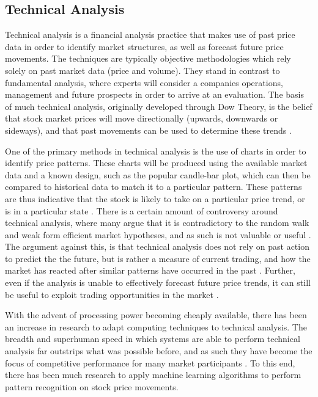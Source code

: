 \documentclass[a4paper,latin]{paper}
\begin{document}
\subsection{Technical Analysis}\label{lr_TechnicalAnalysis}

Technical analysis is a financial analysis practice that makes use of past price data in order to identify market 
structures, as well as forecast future price movements. The techniques are typically objective methodologies 
which rely solely on past market data (price and volume). They stand in contrast to fundamental analysis, where 
experts will consider a companies operations, management and future prospects in order to arrive at an evaluation. 
The basis of much technical analysis, originally developed through Dow Theory, is the belief that stock market 
prices will move directionally (upwards, downwards or sideways), and that past movements can be used to 
determine these trends  \cite {Murphy}.
\hfill \break 

One of the primary methods in technical analysis is the use of charts in order to identify price patterns. 
These charts will be produced using the available market data and a known design, such as the popular candle-bar 
plot, which can then be compared to historical data to match it to a particular pattern. These patterns are thus 
indicative that the stock is likely to take on a particular price trend, or is in a particular state \cite {Murphy}.  
There is a certain amount of controversy around technical analysis, where many argue that it is contradictory 
to the random walk and weak form efficient market hypotheses, and as such is not valuable or useful \cite {Griffioen}. 
The argument against this, is that technical analysis does not rely on past action to predict the the future, but is 
rather a measure of current trading, and how the market has reacted after similar patterns have occurred in the 
past \cite {Kahn}. Further, even if the analysis is unable to effectively forecast future price trends, it can still be useful 
to exploit trading opportunities in the market \cite{Schwager}.
\hfill \break 

With the advent of processing power becoming cheaply available, there has been an increase in research to 
adapt computing techniques to technical analysis. The breadth and superhuman speed in which systems are 
able to perform technical analysis far outstrips what was possible before, and as such they have become the 
focus of competitive performance for many market participants \cite {Johnson}. To this end, there has been much 
research to apply machine learning algorithms to perform pattern recognition on stock price movements.
\hfill \break
\end{document}
